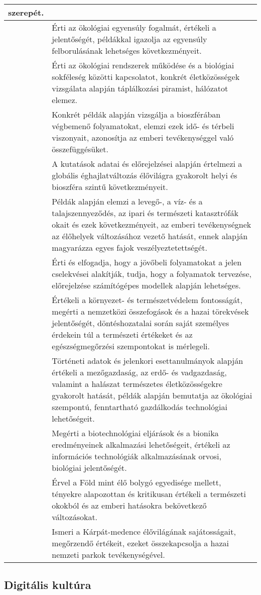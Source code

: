 \begin{longtable}[]{p{\evflength}@{\strut}>{\begin{minipage}{\columnlength}\strut}l<{\strut\end{minipage}}}
  szerepét.
\tabularnewline
\hline
&
  Érti az ökológiai egyensúly fogalmát, értékeli a jelentőségét,
  példákkal igazolja az egyensúly felborulásának lehetséges
  következményeit.
\tabularnewline
\hline
&
  Érti az ökológiai rendszerek működése és a biológiai sokféleség
  közötti kapcsolatot, konkrét életközösségek vizsgálata alapján
  táplálkozási piramist, hálózatot elemez.
\tabularnewline
\hline
&
  Konkrét példák alapján vizsgálja a bioszférában végbemenő
  folyamatokat, elemzi ezek idő- és térbeli viszonyait, azonosítja az
  emberi tevékenységgel való összefüggésüket.
\tabularnewline
\hline
&
  A kutatások adatai és előrejelzései alapján értelmezi a globális
  éghajlatváltozás élővilágra gyakorolt helyi és bioszféra szintű
  következményeit.
\tabularnewline
\hline
&
  Példák alapján elemzi a levegő-, a víz- és a talajszennyeződés, az
  ipari és természeti katasztrófák okait és ezek következményeit, az
  emberi tevékenységnek az élőhelyek változásához vezető hatását, ennek
  alapján magyarázza egyes fajok veszélyeztetettségét.
\tabularnewline
\hline
&
  Érti és elfogadja, hogy a jövőbeli folyamatokat a jelen cselekvései
  alakítják, tudja, hogy a folyamatok tervezése, előrejelzése
  számítógépes modellek alapján lehetséges.
\tabularnewline
\hline
&
  Értékeli a környezet- és természetvédelem fontosságát, megérti a
  nemzetközi összefogások és a hazai törekvések jelentőségét,
  döntéshozatalai során saját személyes érdekein túl a természeti
  értékeket és az egészségmegőrzési szempontokat is mérlegeli.
\tabularnewline
\hline
&
  Történeti adatok és jelenkori esettanulmányok alapján értékeli a
  mezőgazdaság, az erdő- és vadgazdaság, valamint a halászat természetes
  életközösségekre gyakorolt hatását, példák alapján bemutatja az
  ökológiai szempontú, fenntartható gazdálkodás technológiai
  lehetőségeit.
\tabularnewline
\hline
&
  Megérti a biotechnológiai eljárások és a bionika eredményeinek
  alkalmazási lehetőségeit, értékeli az információs technológiák
  alkalmazásának orvosi, biológiai jelentőségét.
\tabularnewline
\hline
&
  Érvel a Föld mint élő bolygó egyedisége mellett, tényekre alapozottan
  és kritikusan értékeli a természeti okokból és az emberi hatásokra
  bekövetkező változásokat.
\tabularnewline
\hline
&
  Ismeri a Kárpát-medence élővilágának sajátosságait, megőrzendő
  értékeit, ezeket összekapcsolja a hazai nemzeti parkok
  tevékenységével.
\tabularnewline
\hline
\end{longtable}

\hypertarget{digitalis-kultura}{%
\subsection{Digitális kultúra}\label{digitalis-kultura}}

